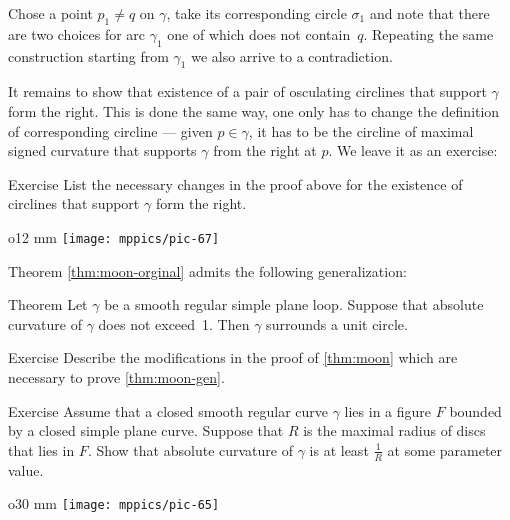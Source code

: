 Chose a point $p_1\ne q$ on $\gamma$, take its corresponding circle $\sigma_1$ and note that there are two choices for arc $\gamma_1$ one of which does not contain~$q$.
Repeating the same construction starting from $\gamma_1$ we also arrive to a contradiction.

It remains to show that existence of a pair of osculating circlines that support $\gamma$ form the right.
This is done the same way, one only has to change the definition of corresponding circline --- given $p\in\gamma$, it has to be the circline of maximal signed curvature that supports $\gamma$ from the right at $p$.
We leave it as an exercise:

\begin{thm}{Exercise}\label{ex:finish-moon}
List the necessary changes in the proof above for the existence of circlines that support $\gamma$ form the right.\qeds
\end{thm}

{

\begin{wrapfigure}{o}{12 mm}
\vskip-0mm
\centering
\texttt{[image: mppics/pic-67]}
\vskip0mm
\end{wrapfigure}

Theorem \ref{thm:moon-orginal} admits the following generalization:

\begin{thm}{Theorem}\label{thm:moon-gen}
Let $\gamma$ be a smooth regular simple plane loop.
Suppose that absolute curvature of $\gamma$ does not exceed~1.
Then $\gamma$ surrounds a unit circle.
\end{thm}

}


\begin{thm}{Exercise}\label{ex:moon-loop}
Describe the modifications in the proof of \ref{thm:moon} which are necessary to prove \ref{thm:moon-gen}.
\end{thm}

\begin{thm}{Exercise}\label{ex:moon-rad}
Assume that a closed smooth regular curve $\gamma$ lies in a figure $F$ bounded by a closed simple plane curve.
Suppose that $R$ is the maximal radius of discs that lies in $F$.
Show that absolute curvature of $\gamma$ is at least $\tfrac1R$ at some parameter value.
\end{thm}

\begin{wrapfigure}{o}{30 mm}
\vskip-8mm
\centering
\texttt{[image: mppics/pic-65]}
\vskip0mm
\end{wrapfigure}


